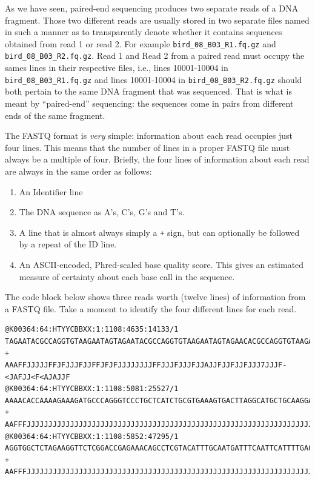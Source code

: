 \documentclass[]{krantz}
\providecommand{\tightlist}{%
  \setlength{\itemsep}{0pt}\setlength{\parskip}{0pt}}
\begin{document}
As we have seen, paired-end sequencing produces two separate reads of a DNA
fragment. Those two different reads are usually stored in two separate files named
in such a manner as to transparently denote whether it contains sequences obtained
from read 1 or read 2.
For example \texttt{bird\_08\_B03\_R1.fq.gz} and \texttt{bird\_08\_B03\_R2.fq.gz}. Read 1 and Read 2 from
a paired read must occupy the sames lines in their respective files, i.e., lines
10001-10004 in \texttt{bird\_08\_B03\_R1.fq.gz} and lines 10001-10004 in \texttt{bird\_08\_B03\_R2.fq.gz}
should both pertain to the same DNA fragment that was sequenced. That is what is
meant by ``paired-end'' sequencing: the sequences come in pairs from different
ends of the same fragment.

The FASTQ format is \emph{very} simple: information about each read occupies just four lines.
This means that the number of lines in a proper FASTQ file must always be a multiple of four.
Briefly, the four lines of information about each read are always in the same order as follows:

\begin{enumerate}
\def\labelenumi{\arabic{enumi}.}
\tightlist
\item
  An Identifier line
\item
  The DNA sequence as A's, C's, G's and T's.
\item
  A line that is almost always simply a \texttt{+} sign, but can optionally be followed
  by a repeat of the ID line.
\item
  An ASCII-encoded, Phred-scaled base quality score. This gives an estimated
  measure of certainty about each base call in the sequence.
\end{enumerate}

The code block below shows three reads worth (twelve lines) of
information from a FASTQ file.
Take a moment to identify the four different lines for each read.

\begin{verbatim}
@K00364:64:HTYYCBBXX:1:1108:4635:14133/1
TAGAATACGCCAGGTGTAAGAATAGTAGAATACGCCAGGTGTAAGAATAGTAGAACACGCCAGGTGTAAGAATAGTAGAA
+
AAAFFJJJJJFFJFJJJFJJFFJFJFJJJJJJJJFFJJJFJJJFJJAJJFJJFJJFJJJ7JJJF-<JAFJJ<F<AJAJJF
@K00364:64:HTYYCBBXX:1:1108:5081:25527/1
AAAACACCAAAAGAAAGATGCCCAGGGTCCCTGCTCATCTGCGTGAAAGTGACTTAGGCATGCTGCAAGGAGGCATGAGG
+
AAFFFJJJJJJJJJJJJJJJJJJJJJJJJJJJJJJJJJJJJJJJJJJJJJJJJJJJJJJJJJJJJJJJJJJJJJJJJJJJ
@K00364:64:HTYYCBBXX:1:1108:5852:47295/1
AGGTGGCTCTAGAAGGTTCTCGGACCGAGAAACAGCCTCGTACATTTGCAATGATTTCAATTCATTTTGACCATTACGAA
+
AAFFFJJJJJJJJJJJJJJJJJJJJJJJJJJJJJJJJJJJJJJJJJJJJJJJJJJJJJJJJJJJJJJJJJJJJJJJJJJJ
\end{verbatim}
\end{document}
